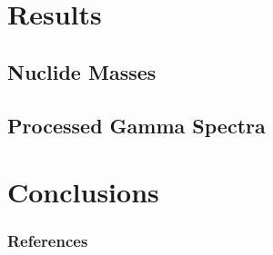 \documentclass[10pt]{beamer}
\begin{document}
\section{Results}
\subsection{Nuclide Masses}

\subsection{Processed Gamma Spectra}


\section{Conclusions}




\begin{frame}[allowframebreaks]
  \frametitle{References}
  
  {\footnotesize  }
\end{frame}

\end{document}
